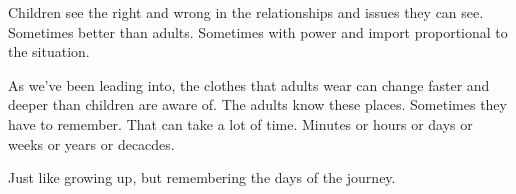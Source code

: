 

Children see the right and wrong in the relationships and issues they
can see.  Sometimes better than adults.  Sometimes with power and
import proportional to the situation.

As we've been leading into, the clothes that adults wear can change
faster and deeper than children are aware of.  The adults know these
places.  Sometimes they have to remember.  That can take a lot of
time.  Minutes or hours or days or weeks or years or decacdes.  

Just like growing up, but remembering the days of the journey.

\bye
